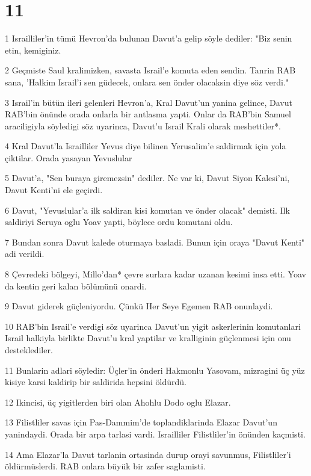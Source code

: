 \chapter{11}

\par 1 Israilliler'in tümü Hevron'da bulunan Davut'a gelip söyle dediler: "Biz senin etin, kemiginiz.
\par 2 Geçmiste Saul kralimizken, savasta Israil'e komuta eden sendin. Tanrin RAB sana, 'Halkim Israil'i sen güdecek, onlara sen önder olacaksin diye söz verdi."
\par 3 Israil'in bütün ileri gelenleri Hevron'a, Kral Davut'un yanina gelince, Davut RAB'bin önünde orada onlarla bir antlasma yapti. Onlar da RAB'bin Samuel araciligiyla söyledigi söz uyarinca, Davut'u Israil Krali olarak meshettiler*.
\par 4 Kral Davut'la Israilliler Yevus diye bilinen Yerusalim'e saldirmak için yola çiktilar. Orada yasayan Yevuslular
\par 5 Davut'a, "Sen buraya giremezsin" dediler. Ne var ki, Davut Siyon Kalesi'ni, Davut Kenti'ni ele geçirdi.
\par 6 Davut, "Yevuslular'a ilk saldiran kisi komutan ve önder olacak" demisti. Ilk saldiriyi Seruya oglu Yoav yapti, böylece ordu komutani oldu.
\par 7 Bundan sonra Davut kalede oturmaya basladi. Bunun için oraya "Davut Kenti" adi verildi.
\par 8 Çevredeki bölgeyi, Millo'dan* çevre surlara kadar uzanan kesimi insa etti. Yoav da kentin geri kalan bölümünü onardi.
\par 9 Davut giderek güçleniyordu. Çünkü Her Seye Egemen RAB onunlaydi.
\par 10 RAB'bin Israil'e verdigi söz uyarinca Davut'un yigit askerlerinin komutanlari Israil halkiyla birlikte Davut'u kral yaptilar ve kralliginin güçlenmesi için onu desteklediler.
\par 11 Bunlarin adlari söyledir: Üçler'in önderi Hakmonlu Yasovam, mizragini üç yüz kisiye karsi kaldirip bir saldirida hepsini öldürdü.
\par 12 Ikincisi, üç yigitlerden biri olan Ahohlu Dodo oglu Elazar.
\par 13 Filistliler savas için Pas-Dammim'de toplandiklarinda Elazar Davut'un yanindaydi. Orada bir arpa tarlasi vardi. Israilliler Filistliler'in önünden kaçmisti.
\par 14 Ama Elazar'la Davut tarlanin ortasinda durup orayi savunmus, Filistliler'i öldürmüslerdi. RAB onlara büyük bir zafer saglamisti.
